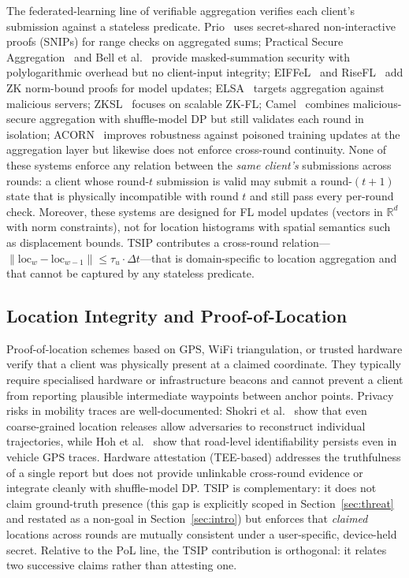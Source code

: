 \documentclass[conference]{IEEEtran}
\theoremstyle{definition}
\theoremstyle{plain}
\begin{document}
The federated-learning line of verifiable aggregation verifies each client's
submission against a stateless predicate. Prio~\cite{Corrigan2017Prio}
uses secret-shared non-interactive proofs (SNIPs) for range checks on
aggregated sums; Practical Secure Aggregation~\cite{Segal2017PracticalSecAgg}
and Bell et al.~\cite{Bell2020SecureSingle} provide masked-summation security
with polylogarithmic overhead but no client-input integrity;
EIFFeL~\cite{Chowdhury2022EIFFeL} and RiseFL~\cite{Pillutla2024RiseFL} add
ZK norm-bound proofs for model updates; ELSA~\cite{Ma2023ELSA} targets
aggregation against malicious servers; ZKSL~\cite{Wang2024ZKSL} focuses on
scalable ZK-FL; Camel~\cite{Xu2024Camel} combines malicious-secure
aggregation with shuffle-model DP but still validates each round in
isolation; ACORN~\cite{Bell2023ACORN} improves robustness against poisoned
training updates at the aggregation layer but likewise does not enforce
cross-round continuity. None of these systems enforce any relation between the
\emph{same client's} submissions across rounds: a client whose round-$t$
submission is valid may submit a round-$(t{+}1)$ state that is physically
incompatible with round $t$ and still pass every per-round check.
Moreover, these systems are designed for FL model updates (vectors in
$\mathbb{R}^d$ with norm constraints), not for location histograms with
spatial semantics such as displacement bounds. \textsc{TSIP} contributes a
cross-round relation---$\|\mathrm{loc}_w - \mathrm{loc}_{w-1}\| \leq \tau_u\!\cdot\!\Delta t$---that
is domain-specific to location aggregation and that cannot be captured by
any stateless predicate.

\subsection{Location Integrity and Proof-of-Location}

Proof-of-location schemes based on GPS, WiFi triangulation, or trusted
hardware verify that a client was physically present at a claimed
coordinate. They typically require specialised hardware or infrastructure
beacons and cannot prevent a client from reporting plausible intermediate
waypoints between anchor points. Privacy risks in mobility traces are
well-documented: Shokri et al.~\cite{Shokri2011Quantifying} show that
even coarse-grained location releases allow adversaries to reconstruct
individual trajectories, while Hoh et al.~\cite{Hoh2007Preserving} show
that road-level identifiability persists even in vehicle GPS traces.
Hardware attestation (TEE-based) addresses the truthfulness of a single
report but does not provide unlinkable cross-round evidence or integrate
cleanly with shuffle-model DP. \textsc{TSIP} is complementary: it does
not claim ground-truth presence (this gap is explicitly scoped in
Section~\ref{sec:threat} and restated as a non-goal in
Section~\ref{sec:intro}) but enforces that \emph{claimed} locations
across rounds are mutually consistent under a user-specific, device-held
secret. Relative to the PoL line, the \textsc{TSIP} contribution is
orthogonal: it relates two successive claims rather than attesting one.
\end{document}
